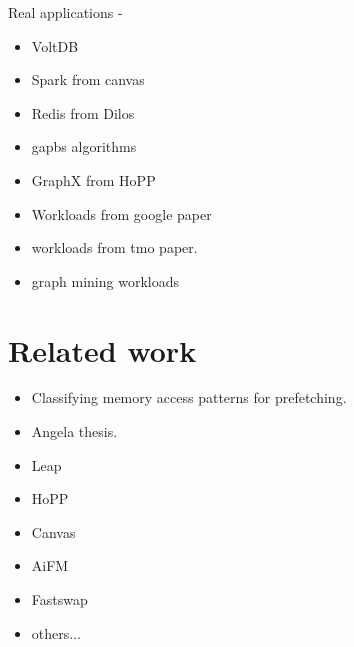 Real applications - 
\begin{itemize}
    \item VoltDB
    \item Spark from canvas
    \item Redis from Dilos
    \item gapbs algorithms
    \item GraphX from HoPP
    \item Workloads from google paper
    \item workloads from tmo paper.
    \item graph mining workloads
\end{itemize}

\section{Related work}
\begin{itemize}
    \item Classifying memory access patterns for prefetching. 
    \item Angela thesis. 
\end{itemize}

\begin{itemize}
    \item Leap
    \item HoPP
    \item Canvas
    \item AiFM
    \item Fastswap
    \item others...
\end{itemize}